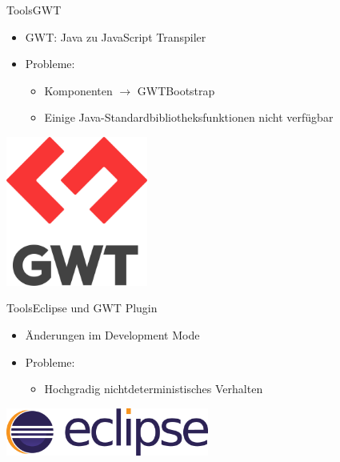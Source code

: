 \documentclass[10pt]{beamer}
\begin{document}
\begin{frame}{Tools}{GWT}
	\begin{itemize}
		\item GWT: Java zu JavaScript Transpiler 
		\item Probleme: 
		\begin{itemize}
			\item Komponenten $\rightarrow$ GWTBootstrap
			\item Einige Java-Standardbibliotheksfunktionen nicht verfügbar
		\end{itemize}
	\end{itemize}
	\vspace{3.4cm}
    \hfill\includegraphics[width = 0.35\textwidth]{img/gwt-cropped}
\end{frame}

\begin{frame}{Tools}{Eclipse und GWT Plugin}
	\begin{itemize}
		\item Änderungen im Development Mode  
		\item Probleme:
		\begin{itemize}
			\item Hochgradig nichtdeterministisches Verhalten
		\end{itemize}
	\end{itemize}
	\vspace{4cm}
    \hfill\includegraphics[width = 0.5\textwidth]{img/eclipse}
\end{frame}
\end{document}
